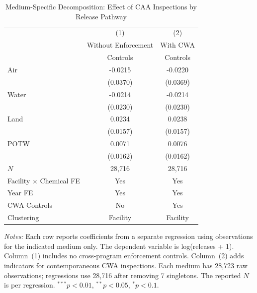 \begin{table}[htbp]
\centering
\caption{Medium-Specific Decomposition: Effect of CAA Inspections by Release Pathway}
\label{tab:decomp}
\begin{tabular}{lcc}
\toprule
& (1) & (2) \\
& Without Enforcement & With CWA \\
& Controls & Controls \\
\midrule
Air & -0.0215 & -0.0220 \\
& (0.0370) & (0.0369) \\[6pt]
Water & -0.0214 & -0.0214 \\
& (0.0230) & (0.0230) \\[6pt]
Land & 0.0234 & 0.0238 \\
& (0.0157) & (0.0157) \\[6pt]
POTW & 0.0071 & 0.0076 \\
& (0.0162) & (0.0162) \\[6pt]
\midrule
$N$ & 28,716 & 28,716 \\
Facility $\times$ Chemical FE & Yes & Yes \\
Year FE & Yes & Yes \\
CWA Controls & No & Yes \\
Clustering & Facility & Facility \\
\bottomrule
\end{tabular}
\begin{minipage}{0.95\textwidth}
\vspace{0.3em}
\footnotesize \textit{Notes:} Each row reports coefficients from a separate regression using observations for the indicated medium only. The dependent variable is log(releases + 1). Column~(1) includes no cross-program enforcement controls. Column~(2) adds indicators for contemporaneous CWA inspections. Each medium has 28,723 raw observations; regressions use 28,716 after removing 7 singletons. The reported $N$ is per regression. $^{***}p<0.01$, $^{**}p<0.05$, $^{*}p<0.1$.
\end{minipage}
\end{table}
